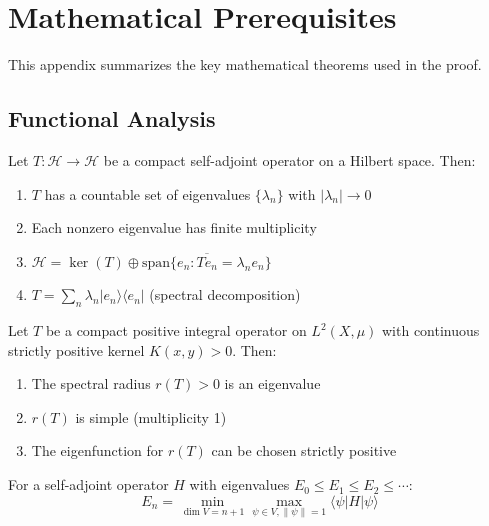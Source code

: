 \section{Mathematical Prerequisites}
\label{app:prerequisites}

This appendix summarizes the key mathematical theorems used in the proof.

\subsection{Functional Analysis}

\begin{theorem}
Let $T : \mathcal{H} \to \mathcal{H}$ be a compact self-adjoint operator on a 
Hilbert space. Then:
\begin{enumerate}[label=(\roman*)]
\item $T$ has a countable set of eigenvalues $\{\lambda_n\}$ with $|\lambda_n| \to 0$
\item Each nonzero eigenvalue has finite multiplicity
\item $\mathcal{H} = \ker(T) \oplus \overline{\text{span}\{e_n : Te_n = \lambda_n e_n\}}$
\item $T = \sum_n \lambda_n |e_n\rangle\langle e_n|$ (spectral decomposition)
\end{enumerate}
\end{theorem}

\begin{theorem}
Let $T$ be a compact positive integral operator on $L^2(X, \mu)$ with continuous 
strictly positive kernel $K(x,y) > 0$. Then:
\begin{enumerate}[label=(\roman*)]
\item The spectral radius $r(T) > 0$ is an eigenvalue
\item $r(T)$ is simple (multiplicity 1)
\item The eigenfunction for $r(T)$ can be chosen strictly positive
\end{enumerate}
\end{theorem}

\begin{theorem}
For a self-adjoint operator $H$ with eigenvalues $E_0 \leq E_1 \leq E_2 \leq \cdots$:
\[
E_n = \min_{\dim V = n+1} \max_{\psi \in V, \|\psi\|=1} \langle \psi | H | \psi \rangle
\]
\end{theorem}

